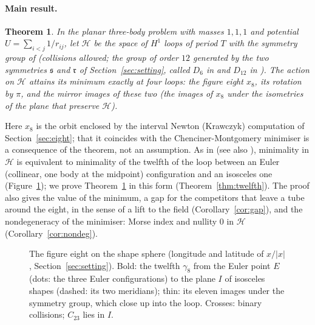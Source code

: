 \documentclass[11pt]{article}
\newtheorem{theorem}{Theorem}
\theoremstyle{definition}
\begin{document}
\paragraph{Main result.}
\begin{theorem}\label{thm:main}
In the planar three-body problem with masses $1,1,1$ and potential $U=\sum_{i<j}1/r_{ij}$, let $\mathcal H$ be the space
of $H^1$ loops of period $T$ with the symmetry group of \cite{CM} (collisions allowed; the group of order $12$ generated
by the two symmetries $\mathfrak s$ and $\mathfrak r$ of Section~\ref{sec:setting}, called $D_6$ in \cite{CM} and
$D_{12}$ in \cite{BFT}). The action on $\mathcal H$ attains its minimum exactly at four loops: the figure eight $x_8$,
its rotation by $\pi$, and the mirror images of these two (the images of $x_8$ under the isometries of the plane that
preserve $\mathcal H$).
\end{theorem}
Here $x_8$ is the orbit enclosed by the interval Newton (Krawczyk) computation of Section~\ref{sec:eight}; that it
coincides with the Chenciner-Montgomery minimiser is a consequence of the theorem, not an assumption.
As in \cite{CM} (see also \cite{FM}), minimality in $\mathcal H$ is equivalent to minimality of the twelfth of the loop
between an Euler (collinear, one body at the midpoint) configuration and an isosceles one (Figure~\ref{fig:shape}); we
prove Theorem~\ref{thm:main} in this form (Theorem~\ref{thm:twelfth}). The proof also gives the value of the minimum,
a gap for the competitors that leave a tube around the eight, in the sense of a lift to the field (Corollary~\ref{cor:gap}), and the nondegeneracy of
the minimiser: Morse index and nullity $0$ in $\mathcal H$ (Corollary~\ref{cor:nondeg}).

\begin{figure}[t]\centering
\figshape
\caption{The figure eight on the shape sphere (longitude and latitude of $x/|x|$, Section~\ref{sec:setting}). Bold: the
twelfth $\gamma_8$ from the Euler point $E$ (dots: the three Euler configurations) to the plane $I$ of isosceles
shapes (dashed: its two meridians); thin: its eleven images under the symmetry group, which close up into the loop.
Crosses: binary collisions; $C_{23}$ lies in $I$.}\label{fig:shape}
\end{figure}
\end{document}
